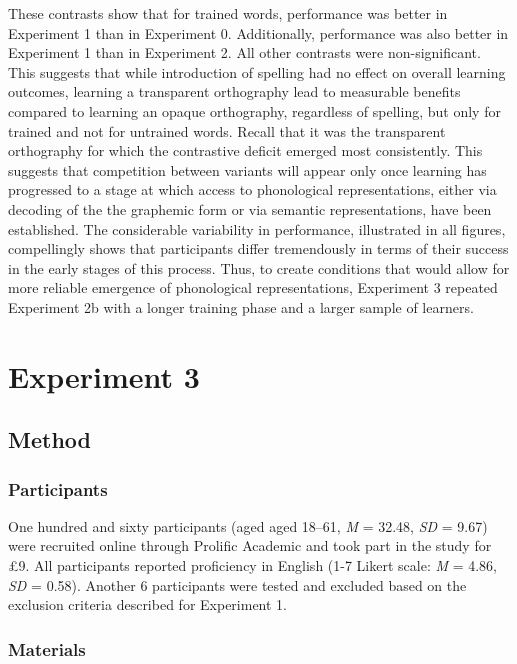 \documentclass[doc,floatsintext]{apa6}
\begin{document}
These contrasts show that for trained words, performance was better in
Experiment 1 than in Experiment 0. Additionally, performance was also
better in Experiment 1 than in Experiment 2. All other contrasts were
non-significant. This suggests that while introduction of spelling had
no effect on overall learning outcomes, learning a transparent
orthography lead to measurable benefits compared to learning an opaque
orthography, regardless of spelling, but only for trained and not for
untrained words. Recall that it was the transparent orthography for
which the contrastive deficit emerged most consistently. This suggests
that competition between variants will appear only once learning has
progressed to a stage at which access to phonological representations,
either via decoding of the the graphemic form or via semantic
representations, have been established. The considerable variability in
performance, illustrated in all figures, compellingly shows that
participants differ tremendously in terms of their success in the early
stages of this process. Thus, to create conditions that would allow for
more reliable emergence of phonological representations, Experiment 3
repeated Experiment 2b with a longer training phase and a larger sample
of learners.

\section{Experiment 3}\label{experiment-3}

\subsection{Method}\label{method-3}

\subsubsection{Participants}\label{participants-3}

One hundred and sixty participants (aged aged 18--61, \emph{M} = 32.48,
\emph{SD} = 9.67) were recruited online through Prolific Academic and
took part in the study for \pounds 9. All participants reported
proficiency in English (1-7 Likert scale: \emph{M} = 4.86, \emph{SD} =
0.58). Another 6 participants were tested and excluded based on the
exclusion criteria described for Experiment 1.

\subsubsection{Materials}\label{materials-3}
\end{document}
